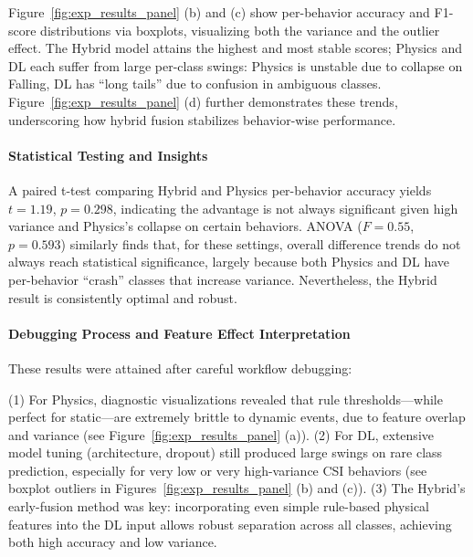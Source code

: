 \documentclass[Afour,sageh,times]{sagej}
\begin{document}
Figure~\ref{fig:exp_results_panel} (b) and (c) show per-behavior accuracy and F1-score distributions via boxplots, visualizing both the variance and the outlier effect. The Hybrid model attains the highest and most stable scores; Physics and DL each suffer from large per-class swings: Physics is unstable due to collapse on Falling, DL has “long tails” due to confusion in ambiguous classes. Figure~\ref{fig:exp_results_panel} (d) further demonstrates these trends, underscoring how hybrid fusion stabilizes behavior-wise performance.




\paragraph{Statistical Testing and Insights}

A paired t-test comparing Hybrid and Physics per-behavior accuracy yields $t=1.19$, $p=0.298$, indicating the advantage is not always significant given high variance and Physics’s collapse on certain behaviors. ANOVA ($F=0.55$, $p=0.593$) similarly finds that, for these settings, overall difference trends do not always reach statistical significance, largely because both Physics and DL have per-behavior “crash” classes that increase variance. Nevertheless, the Hybrid result is consistently optimal and robust.

\paragraph{Debugging Process and Feature Effect Interpretation}

These results were attained after careful workflow debugging:  

(1) For Physics, diagnostic visualizations revealed that rule thresholds—while perfect for static—are extremely brittle to dynamic events, due to feature overlap and variance (see Figure~\ref{fig:exp_results_panel} (a)).
(2) For DL, extensive model tuning (architecture, dropout) still produced large swings on rare class prediction, especially for very low or very high-variance CSI behaviors (see boxplot outliers in Figures~\ref{fig:exp_results_panel} (b) and (c)).
(3) The Hybrid’s early-fusion method was key: incorporating even simple rule-based physical features into the DL input allows robust separation across all classes, achieving both high accuracy and low variance.
\end{document}

